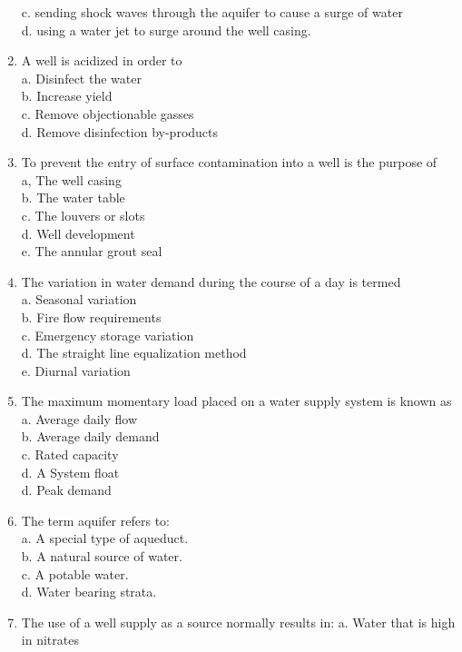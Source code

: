 \begin{enumerate}
c. sending shock waves through the aquifer to cause a surge of water\\
d. using a water jet to surge around the well casing.\\
\item A well is acidized in order to\\
a. Disinfect the water\\
b. Increase yield\\
c. Remove objectionable gasses\\
d. Remove disinfection by-products\\
\item To prevent the entry of surface contamination into a well is the purpose of\\
a, The well casing\\
b. The water table\\
c. The louvers or slots\\
d. Well development\\
e. The annular grout seal\\
\item The variation in water demand during the course of a day is termed\\
a. Seasonal variation\\
b. Fire flow requirements\\
c. Emergency storage variation\\
d. The straight line equalization method\\
e. Diurnal variation\\
\item The maximum momentary load placed on a water supply system is known as\\
a. Average daily flow\\
b. Average daily demand\\
c. Rated capacity\\
d. A System float\\
d. Peak demand\\
\item The term aquifer refers to:\\
a. A special type of aqueduct.\\
b. A natural source of water.\\
c. A potable water.\\
d. Water bearing strata.\\
\item The use of a well supply as a source normally results in: a. Water that is high in nitrates\\

\end{enumerate}

